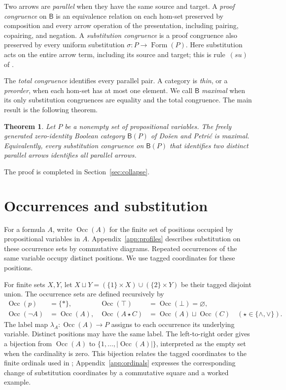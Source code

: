 \documentclass[11pt]{article}
\newtheorem{theorem}{Theorem}[section]
\newcommand{\B}{\mathsf B}
\newcommand{\Occ}{\operatorname{Occ}}
\newcommand{\FormulaSet}{\operatorname{Form}}
\begin{document}
Two arrows are \emph{parallel} when they have the same source and
target. A \emph{proof congruence} on $\B$ is an equivalence relation
on each hom-set preserved by composition and every arrow operation
of the presentation, including pairing, copairing, and negation.
A \emph{substitution congruence} is a proof congruence also preserved
by every uniform substitution $\sigma:P\to\FormulaSet(P)$.
Here substitution acts on the entire arrow term, including its source
and target; this is rule~$(su)$ of \cite[\S2.7, p.~51]{DP}.

The \emph{total congruence} identifies every parallel pair. A category
is \emph{thin}, or a \emph{preorder}, when each hom-set has at most one
element. We call $\B$ \emph{maximal} when its only substitution
congruences are equality and the total congruence. The main result is
the following theorem.

\begin{theorem}\label{thm:main}
Let $P$ be a nonempty set of propositional variables. The freely
generated zero-identity Boolean category $\B(P)$ of Do\v{s}en and
Petri\'c is maximal. Equivalently, every substitution congruence on
$\B(P)$ that identifies two distinct parallel arrows identifies all
parallel arrows.
\end{theorem}

The proof is completed in Section~\ref{sec:collapse}.

\section{Occurrences and substitution}\label{sec:occurrences}

For a formula $A$, write $\Occ(A)$ for the finite set of positions
occupied by propositional variables in $A$.
Appendix~\ref{app:profiles} describes substitution on these occurrence
sets by commutative diagrams. Repeated occurrences of the same variable
occupy distinct positions. We use tagged coordinates for these positions.

For finite sets $X,Y$, let
$X\sqcup Y=(\{1\}\times X)\cup(\{2\}\times Y)$ be their tagged
disjoint union. The occurrence sets are defined recursively by
\[
 \begin{aligned}
 \Occ(p)&=\{*\},&
 \Occ(\top)&=\Occ(\bot)=\varnothing,\\
 \Occ(\neg A)&=\Occ(A),&
 \Occ(A\mathbin\star C)&=\Occ(A)\sqcup\Occ(C)
       \quad(\star\in\{\wedge,\vee\}).
 \end{aligned}
\]
The label map $\lambda_A:\Occ(A)\to P$ assigns to each occurrence
its underlying variable. Distinct positions may have the same label.
The left-to-right
order gives a bijection from $\Occ(A)$ to
$\{1,\ldots,|\Occ(A)|\}$, interpreted as the empty set when the
cardinality is zero. This bijection relates the tagged coordinates to
the finite ordinals used in \cite{DP}; Appendix~\ref{app:ordinals}
expresses the corresponding change of substitution coordinates by a
commutative square and a worked example.
\end{document}
